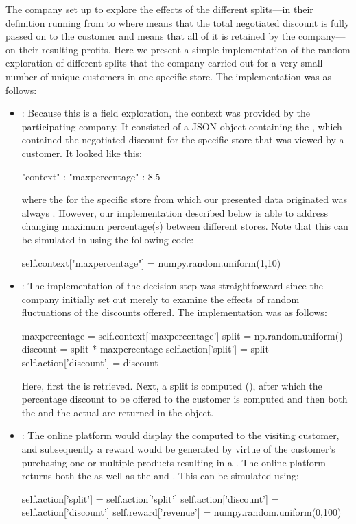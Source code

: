 \documentclass[nojss]{jss}
\begin{document}
The company set up  to explore the effects of the different splits---in their definition running from  to  where  means that the total negotiated discount is fully passed on to the customer and  means that all of it is retained by the company---on their resulting profits. Here we present a simple implementation of the random exploration of different splits that the company carried out for a very small number of  unique customers in one specific store. The implementation was as follows:

\begin{itemize}
\item {}: Because this is a field exploration, the context was provided by the participating company. It consisted of a JSON object containing the , which contained the negotiated discount for the specific store that was viewed by a customer. It looked like this:
\begin{Code}
{"context" : {"maxpercentage" : 8.5}}
\end{Code}
where the  for the specific store from which our presented data originated was always . However, our implementation described below is able to address changing maximum percentage(s) between different stores. Note that this can be simulated in  using the following  code:
\begin{Code}
self.context["maxpercentage"] = numpy.random.uniform(1,10)
\end{Code}

\item {}: The implementation of the decision step was straightforward since the company initially set out merely to examine the effects of random fluctuations of the discounts offered. The implementation was as follows:
\begin{Code}
maxpercentage = self.context['maxpercentage']
split = np.random.uniform()
discount = split * maxpercentage
self.action['split'] = split 
self.action['discount'] = discount
\end{Code}
Here, first the  is retrieved. Next, a split is computed (), after which the percentage discount to be offered to the customer is computed and then both the  and the actual  are returned in the  object.

\item {}: The online platform would display the computed  to the visiting customer, and subsequently a reward would be generated by virtue of the customer's purchasing one or multiple products resulting in a . The online platform returns both the  as well as the  and . 
This can be simulated using:
\begin{Code}
self.action['split'] = self.action['split']
self.action['discount'] = self.action['discount']
self.reward['revenue'] = numpy.random.uniform(0,100)
\end{Code}


\end{itemize}
\end{document}
